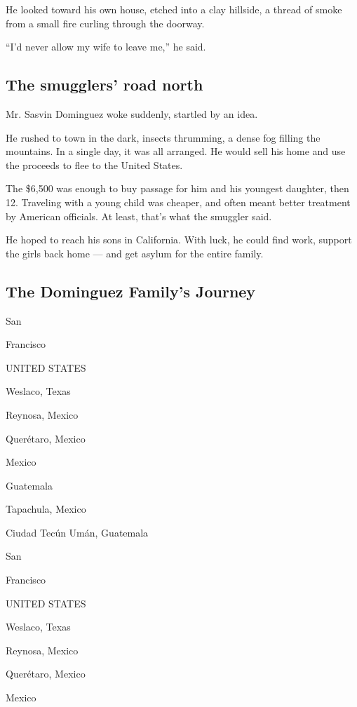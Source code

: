 He looked toward his own house, etched into a clay hillside, a thread of
smoke from a small fire curling through the doorway.

``I'd never allow my wife to leave me,'' he said.

\hypertarget{the-smugglers-road-north}{%
\subsection{The smugglers' road north}\label{the-smugglers-road-north}}

Mr. Sasvin Dominguez woke suddenly, startled by an idea.

He rushed to town in the dark, insects thrumming, a dense fog filling
the mountains. In a single day, it was all arranged. He would sell his
home and use the proceeds to flee to the United States.

The \$6,500 was enough to buy passage for him and his youngest daughter,
then 12. Traveling with a young child was cheaper, and often meant
better treatment by American officials. At least, that's what the
smuggler said.

He hoped to reach his sons in California. With luck, he could find work,
support the girls back home --- and get asylum for the entire family.

\hypertarget{the-dominguez-familys-journey}{%
\subsection{The Dominguez Family's
Journey}\label{the-dominguez-familys-journey}}

San

Francisco

UNITED STATES

Weslaco, Texas

Reynosa, Mexico

Querétaro, Mexico

Mexico

Guatemala

Tapachula, Mexico

Ciudad Tecún Umán, Guatemala

San

Francisco

UNITED STATES

Weslaco, Texas

Reynosa, Mexico

Querétaro, Mexico

Mexico

